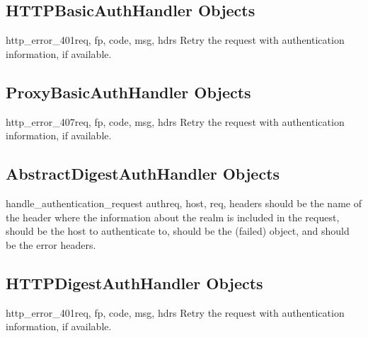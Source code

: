 \subsection{HTTPBasicAuthHandler Objects
            \label{http-basic-auth-handler}}

\begin{methoddesc}[HTTPBasicAuthHandler]{http_error_401}{req, fp, code, 
                                                        msg, hdrs}
Retry the request with authentication information, if available.
\end{methoddesc}


\subsection{ProxyBasicAuthHandler Objects
            \label{proxy-basic-auth-handler}}

\begin{methoddesc}[ProxyBasicAuthHandler]{http_error_407}{req, fp, code, 
                                                        msg, hdrs}
Retry the request with authentication information, if available.
\end{methoddesc}


\subsection{AbstractDigestAuthHandler Objects
            \label{abstract-digest-auth-handler}}

\begin{methoddesc}[AbstractDigestAuthHandler]{handle_authentication_request}
                                            {authreq, host, req, headers}
 should be the name of the header where the information about
the realm is included in the request,  should be the host to
authenticate to,  should be the (failed) 
object, and  should be the error headers.
\end{methoddesc}


\subsection{HTTPDigestAuthHandler Objects
            \label{http-digest-auth-handler}}

\begin{methoddesc}[HTTPDigestAuthHandler]{http_error_401}{req, fp, code, 
                                                        msg, hdrs}
Retry the request with authentication information, if available.
\end{methoddesc}


